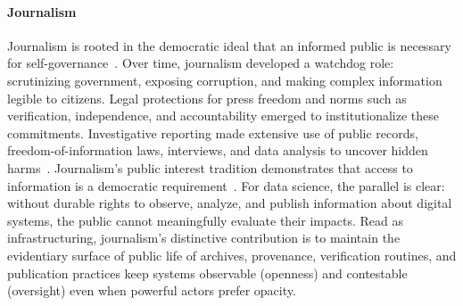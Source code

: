 \documentclass[acmsmall,screen]{acmart}
\begin{document}
\paragraph*{Journalism}
Journalism is rooted in the democratic ideal that an informed public is necessary for self-governance~\cite{ettemaJournalismReasongivingDeliberative2007,deuzeWhatJournalismProfessional2005}. Over time, journalism developed a watchdog role: scrutinizing government, exposing corruption, and making complex information legible to citizens. Legal protections for press freedom and norms such as verification, independence, and accountability emerged to institutionalize these commitments. Investigative reporting made extensive use of public records, freedom-of-information laws, interviews, and data analysis to uncover hidden harms~\cite{glasserInvestigativeJournalismMoral1989,jacquetteJournalismEthicsTruthTelling2009,protessJournalismOutrageInvestigative1992}. Journalism's public interest tradition demonstrates that access to information is a democratic requirement~\cite{zengGhostsNewspapersPublic2022}. For data science, the parallel is clear: without durable rights to observe, analyze, and publish information about digital systems, the public cannot meaningfully evaluate their impacts. Read as infrastructuring, journalism's distinctive contribution is to maintain the evidentiary surface of public life of archives, provenance, verification routines, and publication practices keep systems observable (openness) and contestable (oversight) even when powerful actors prefer opacity.
\end{document}
